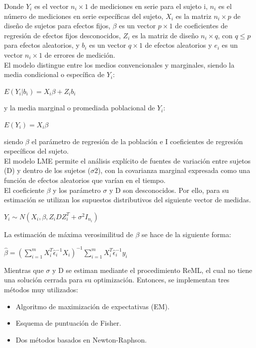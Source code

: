 \documentclass[12pt]{article}
\begin{document}
Donde $Y_{i}$ es el vector $n_{i}\times1$ de mediciones en serie para el sujeto i, $n_{i}$ es el número de mediciones en serie específicas del sujeto, $X_{i}$ es la matriz $n_{i}\times p$ de diseño de sujetos para efectos fijos, $\beta$ es un vector $p\times 1$ de coeficientes de regresión de efectos fijos desconocidos, $Z_{i}$ es la matriz de diseño $n_{i}\times q$, con $q\leq p$ para efectos aleatorios, y $b_{i}$ es un vector $q\times 1$ de efectos aleatorios y $e_{i}$ es un vector $n_{i}\times 1$ de errores de medición.\\

 El modelo distingue entre los medios convencionales y marginales, siendo la media condicional o específica de $Y_{i}$:\\
 \begin{center}
 	$ E(Y_{i}|b_{i}) = X_{i}\beta + Z_{i}b_{i}$
 \end{center}y la media marginal o promediada poblacional de $Y_{i}$:\\
  \begin{center}
  	$E(Y_{i}) = X_{i} \beta$
  \end{center}
  siendo $\beta$ el parámetro de regresión de la población e I coeficientes de regresión específicos del sujeto.\\
  
  
El modelo LME permite el análisis explícito de fuentes de variación entre sujetos (D) y dentro de los sujetos ($\sigma 2$), con la covarianza marginal expresada como una función de efectos aleatorios que varían en el tiempo.\\

El coeficiente $\beta$ y los parámetro $\sigma $ y D son desconocidos. Por ello, para su estimación se utilizan los supuestos distributivos del siguiente vector de medidas. 
\begin{center}
	$Y_{i}\sim N(X_{i},\beta,Z_{i}DZ_{i}^{T} + \sigma ^{2} I_{n_{i}})$
\end{center}
La estimación de máxima verosimilitud de $\beta$ se hace de la siguiente forma:

\begin{center}
	$\hat{\beta}=(\sum_{i=1}^{m}X_{i}^{T} \hat{\epsilon}_{i}^{-1}X_{i})^{-1} \sum_{i=1}^{m} X_{i}^{T} \hat{\epsilon}_{i}^{-1}y_{i}$
\end{center}

Mientras que $\sigma $ y D se estiman mediante el procedimiento ReML, el cual no tiene una solución cerrada para su optimización. Entonces, se implementan tres métodos muy utilizados: 
\begin{itemize}
	\item Algoritmo de maximización de expectativas (EM).
	\item Esquema de puntuación de Fisher.
	\item Dos métodos basados en Newton-Raphson.

\end{itemize}
\end{document}
